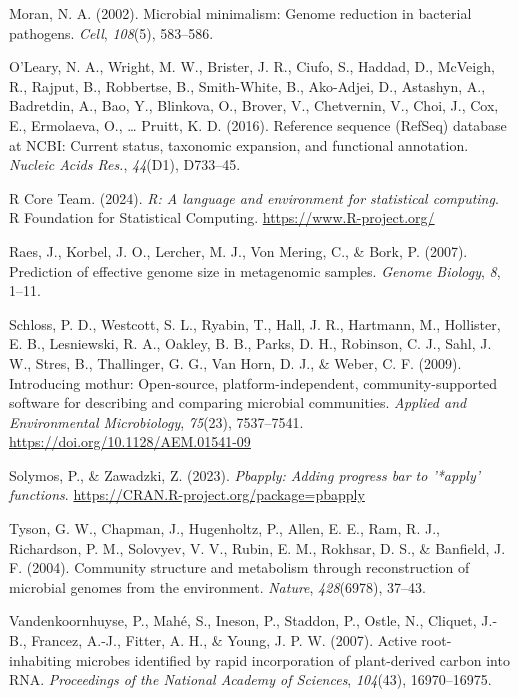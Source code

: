 \documentclass[
]{article}
\newlength{\cslhangindent}
\newenvironment{CSLReferences}[2] %
 {\begin{list}{}{%
  \setlength{\itemindent}{0pt}
  \setlength{\leftmargin}{0pt}
  \setlength{\parsep}{0pt}
  \ifodd #1
   \setlength{\leftmargin}{\cslhangindent}
   \setlength{\itemindent}{-1\cslhangindent}
  \fi
  \setlength{\itemsep}{#2\baselineskip}}}
 {\end{list}}
\begin{document}
\begin{CSLReferences}{1}{0}
Moran, N. A. (2002). Microbial minimalism: Genome reduction in bacterial
pathogens. \emph{Cell}, \emph{108}(5), 583--586.

O'Leary, N. A., Wright, M. W., Brister, J. R., Ciufo, S., Haddad, D.,
McVeigh, R., Rajput, B., Robbertse, B., Smith-White, B., Ako-Adjei, D.,
Astashyn, A., Badretdin, A., Bao, Y., Blinkova, O., Brover, V.,
Chetvernin, V., Choi, J., Cox, E., Ermolaeva, O., \ldots{} Pruitt, K. D.
(2016). Reference sequence ({RefSeq}) database at {NCBI}: Current
status, taxonomic expansion, and functional annotation. \emph{Nucleic
Acids Res.}, \emph{44}(D1), D733--45.

R Core Team. (2024). \emph{R: A language and environment for statistical
computing}. R Foundation for Statistical Computing.
\url{https://www.R-project.org/}

Raes, J., Korbel, J. O., Lercher, M. J., Von Mering, C., \& Bork, P.
(2007). Prediction of effective genome size in metagenomic samples.
\emph{Genome Biology}, \emph{8}, 1--11.

Schloss, P. D., Westcott, S. L., Ryabin, T., Hall, J. R., Hartmann, M.,
Hollister, E. B., Lesniewski, R. A., Oakley, B. B., Parks, D. H.,
Robinson, C. J., Sahl, J. W., Stres, B., Thallinger, G. G., Van Horn, D.
J., \& Weber, C. F. (2009). Introducing mothur: Open-source,
platform-independent, community-supported software for describing and
comparing microbial communities. \emph{Applied and Environmental
Microbiology}, \emph{75}(23), 7537--7541.
\url{https://doi.org/10.1128/AEM.01541-09}

Solymos, P., \& Zawadzki, Z. (2023). \emph{Pbapply: Adding progress bar
to '*apply' functions}. \url{https://CRAN.R-project.org/package=pbapply}

Tyson, G. W., Chapman, J., Hugenholtz, P., Allen, E. E., Ram, R. J.,
Richardson, P. M., Solovyev, V. V., Rubin, E. M., Rokhsar, D. S., \&
Banfield, J. F. (2004). Community structure and metabolism through
reconstruction of microbial genomes from the environment. \emph{Nature},
\emph{428}(6978), 37--43.

Vandenkoornhuyse, P., Mahé, S., Ineson, P., Staddon, P., Ostle, N.,
Cliquet, J.-B., Francez, A.-J., Fitter, A. H., \& Young, J. P. W.
(2007). Active root-inhabiting microbes identified by rapid
incorporation of plant-derived carbon into RNA. \emph{Proceedings of the
National Academy of Sciences}, \emph{104}(43), 16970--16975.


\end{CSLReferences}
\end{document}

